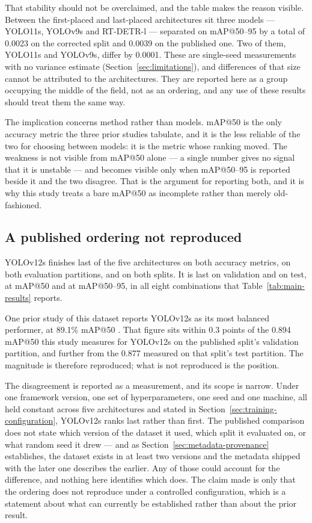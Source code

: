 That stability should not be overclaimed, and the table makes the reason
visible. Between the first-placed and last-placed architectures sit three
models --- YOLO11s, YOLOv9s and RT-DETR-l --- separated on mAP@50--95 by a total
of 0.0023 on the corrected split and 0.0039 on the published one. Two of them,
YOLO11s and YOLOv9s, differ by 0.0001. These are single-seed measurements with
no variance estimate (Section~\ref{sec:limitations}), and differences of that
size cannot be attributed to the architectures. They are reported here as a
group occupying the middle of the field, not as an ordering, and any use of
these results should treat them the same way.

The implication concerns method rather than models. mAP@50 is the only accuracy
metric the three prior studies tabulate, and it is the less reliable of the two
for choosing between models: it is the metric whose ranking moved. The
weakness is not visible from mAP@50 alone --- a single number gives no signal
that it is unstable --- and becomes visible only when mAP@50--95 is reported
beside it and the two disagree. That is the argument for reporting both, and it
is why this study treats a bare mAP@50 as incomplete rather than merely
old-fashioned.

\subsection{A published ordering not reproduced}
\label{sec:ordering}

YOLOv12s finishes last of the five architectures on both accuracy metrics, on
both evaluation partitions, and on both splits. It is last on validation and on
test, at mAP@50 and at mAP@50--95, in all eight combinations that
Table~\ref{tab:main-results} reports.

One prior study of this dataset reports YOLOv12s as its most balanced performer,
at 89.1\% mAP@50 \citep{yolov12paper}. That figure sits within 0.3 points of the
0.894 mAP@50 this study measures for YOLOv12s on the published split's validation
partition, and further from the 0.877 measured on that split's test partition.
The magnitude is therefore reproduced; what is not reproduced is the position.

The disagreement is reported as a measurement, and its scope is narrow. Under
one framework version, one set of hyperparameters, one seed and one machine, all
held constant across five architectures and stated in
Section~\ref{sec:training-configuration}, YOLOv12s ranks last rather than first.
The published comparison does not state which version of the dataset it used,
which split it evaluated on, or what random seed it drew --- and as
Section~\ref{sec:metadata-provenance} establishes, the dataset exists in at
least two versions and the metadata shipped with the later one describes the
earlier. Any of those could account for the difference, and
nothing here identifies which does. The claim made is only that the ordering does
not reproduce under a controlled configuration, which is a statement about what
can currently be established rather than about the prior result.

